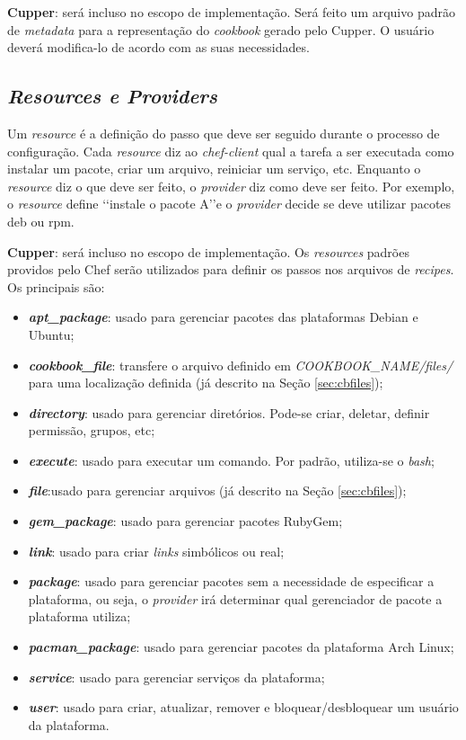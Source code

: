 \textbf{Cupper}: será incluso no escopo de implementação. Será feito um arquivo padrão de
\textit{metadata} para a representação do \textit{cookbook} gerado pelo Cupper. O usuário deverá
modifica-lo de acordo com as suas necessidades.

\subsection{\textit{Resources e Providers}}
\label{sec:cbresource}

Um \textit{resource} é a definição do passo que deve ser seguido durante o processo
de configuração. Cada \textit{resource} diz ao \textit{chef-client} qual a tarefa a ser executada
como instalar um pacote, criar um arquivo, reiniciar um serviço, etc.
Enquanto o \textit{resource} diz o que deve ser feito, o \textit{provider} diz como deve ser
feito. Por exemplo, o \textit{resource} define \lq\lq instale o pacote A\rq\rq e o \textit{provider} decide
se deve utilizar pacotes deb ou rpm.

\textbf{Cupper}: será incluso no escopo de implementação. Os \textit{resources} padrões
providos pelo Chef serão utilizados para definir os passos nos arquivos de
\textit{recipes}. Os principais são:

\begin{itemize}
  \item \textit{\textbf{apt\_package}}: usado para gerenciar pacotes das plataformas Debian e
    Ubuntu;
  \item \textit{\textbf{cookbook\_file}}: transfere o arquivo definido em \textit{COOKBOOK\_NAME/files/} para
    uma localização definida (já descrito na Seção \ref{sec:cbfiles});
  \item \textit{\textbf{directory}}: usado para gerenciar diretórios. Pode-se criar, deletar, definir
    permissão, grupos, etc;
  \item \textit{\textbf{execute}}: usado para executar um comando. Por padrão, utiliza-se o \textit{bash};
  \item \textit{\textbf{file}}:usado para gerenciar arquivos (já descrito na Seção \ref{sec:cbfiles});
  \item \textit{\textbf{gem\_package}}: usado para gerenciar pacotes RubyGem;
  \item \textit{\textbf{link}}: usado para criar \textit{links} simbólicos ou real;
  \item \textit{\textbf{package}}: usado para gerenciar pacotes sem a necessidade de especificar a plataforma,
    ou seja, o \textit{provider} irá determinar qual gerenciador de pacote a plataforma utiliza;
  \item \textit{\textbf{pacman\_package}}: usado para gerenciar pacotes da plataforma Arch Linux;
  \item \textit{\textbf{service}}: usado para gerenciar serviços da plataforma;
  \item \textit{\textbf{user}}: usado para criar, atualizar, remover e bloquear/desbloquear um usuário da plataforma.
\end{itemize}

